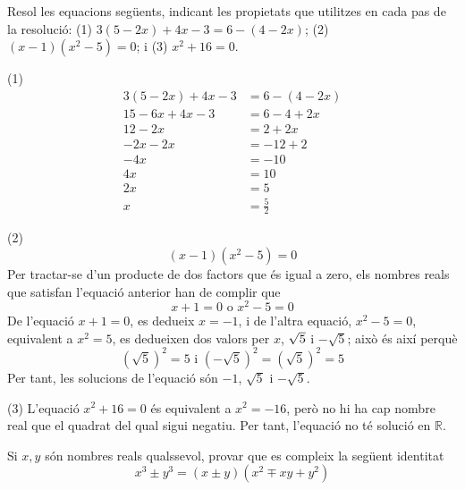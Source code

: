 \begin{exercici}
Resol les equacions següents, indicant les propietats que utilitzes
en cada pas de la resolució: (1) $3(5-2x)+4x-3=6-(4-2x)$; (2) $%
(x-1)(x^{2}-5)=0$; i (3) $x^{2}+16=0$.

\end{exercici}

\begin{solucio}
(1) 
\begin{align*}
3(5-2x)+4x-3 &=6-(4-2x) \\
15-6x+4x-3 &=6-4+2x \\
12-2x &=2+2x \\
-2x-2x &=-12+2 \\
-4x &=-10 \\
4x &=10 \\
2x &=5 \\
x &=\frac{5}{2}
\end{align*}

(2)%
\begin{equation*}
(x-1)(x^{2}-5)=0
\end{equation*}%
Per tractar-se d’un producte de dos factors que és igual a zero, els nombres reals que satisfan l’equació anterior han de complir que%
\begin{equation*}
x+1=0\text{ \ \ o \ \ }x^{2}-5=0
\end{equation*}%
De l’equació $x+1=0$, es dedueix $x=-1$, i de l’altra equació, $%
x^{2}-5=0$, equivalent a $x^{2}=5$, es dedueixen dos valors per $x$, $\sqrt{%
5}$ i $-\sqrt{5}$; això és així perquè%
\begin{equation*}
\left( \sqrt{5}\right) ^{2}=5\text{ \ \ i \ \ }\left( -\sqrt{5}\right)
^{2}=\left( \sqrt{5}\right) ^{2}=5
\end{equation*}%
Per tant, les solucions de l’equació són $-1$, $\sqrt{5}$ i $-%
\sqrt{5}$.

(3) L’equació $x^{2}+16=0$ és equivalent a $x^{2}=-16$, però no hi ha
cap nombre real que el quadrat del qual sigui negatiu. Per tant,
l’equació no té solució en $\mathbb{R}$.
\end{solucio}

\begin{exercici}
Si $x,y$ són nombres reals qualssevol, provar que es compleix la
següent identitat%
\begin{equation*}
x^{3}\pm y^{3}=(x\pm y)(x^{2}\mp xy+y^{2})
\end{equation*}

\end{exercici}

